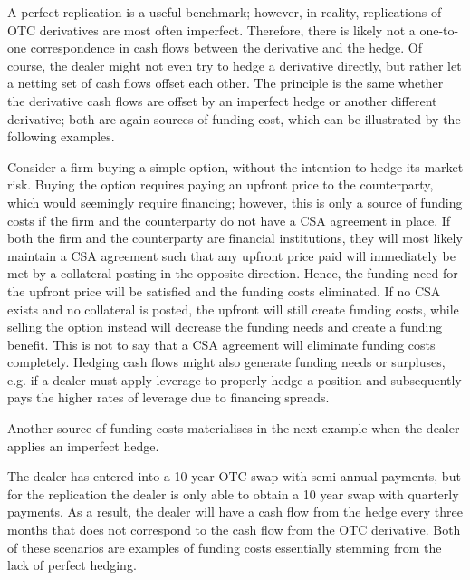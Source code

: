 \documentclass[main.tex]{subfiles}
\begin{document}
        A perfect replication is a useful benchmark;
        however, in reality, replications of OTC derivatives are most often imperfect.
        Therefore, there is likely not a one-to-one correspondence 
        in cash flows between the derivative and the hedge.
        Of course, the dealer might not even try to hedge a derivative directly,
        but rather let a netting set of cash flows offset each other. 
        The principle is the same whether the derivative cash flows are offset by an imperfect hedge
        or another different derivative;
        both are again sources of funding cost, which can be illustrated by the following examples.

        \begin{example}
        Consider a firm buying a simple option, without the intention to hedge its market risk.
        Buying the option requires paying an upfront price to the counterparty,
        which would seemingly require financing;
        however, this is only a source of funding costs 
        if the firm and the counterparty do not have a CSA agreement in place.
        If both the firm and the counterparty are financial institutions, 
        they will most likely maintain a CSA agreement
        such that any upfront price paid will immediately be met by a collateral posting in the opposite direction.
        Hence, the funding need for the upfront price will be satisfied and the funding costs eliminated.
        If no CSA exists and no collateral is posted, the upfront will still create funding costs,
        while selling the option instead will decrease the funding needs and create a funding benefit.
        This is not to say that a CSA agreement will eliminate funding costs completely. 
        Hedging cash flows might also generate funding needs or surpluses, 
        e.g. if a dealer must apply leverage to properly hedge a position 
        and subsequently pays the higher rates of leverage due to financing spreads.
        \end{example}

        Another source of funding costs materialises in the next example when the dealer applies an imperfect hedge.
        
        \begin{example}
        The dealer has entered into a 10 year OTC swap with semi-annual payments, 
        but for the replication the dealer is only able to obtain a 10 year swap with quarterly payments.
        As a result, the dealer will have a cash flow from the hedge every three months
        that does not correspond to the cash flow from the OTC derivative. 
        Both of these scenarios are examples of funding costs essentially stemming from the lack of perfect hedging.
        \end{example}
\end{document}
